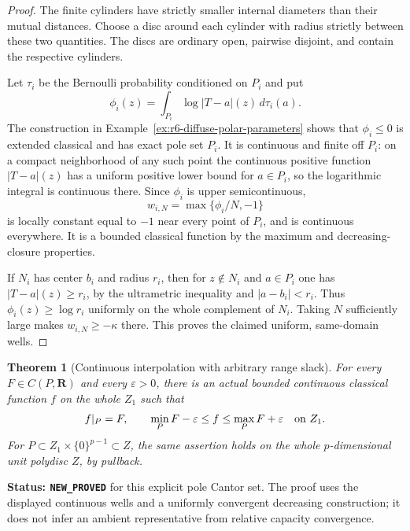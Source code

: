 \documentclass[11pt,a4paper]{article}
\numberwithin{equation}{section}
\newtheorem{theorem}{Theorem}[section]
\theoremstyle{definition}
\theoremstyle{remark}
\begin{document}
\begin{proof}
The finite cylinders have strictly smaller internal diameters than
their mutual distances. Choose a disc around each cylinder with radius
strictly between these two quantities. The discs are ordinary open,
pairwise disjoint, and contain the respective cylinders.

Let $\tau_i$ be the Bernoulli probability conditioned on $P_i$ and put
\[
              \phi_i(z)=\int_{P_i}\log|T-a|(z)\,d\tau_i(a).
\]
The construction in Example~\ref{ex:r6-diffuse-polar-parameters}
shows that $\phi_i\le0$ is extended classical and has exact pole set
$P_i$. It is continuous and finite off $P_i$: on a compact neighborhood
of any such point the continuous positive function $|T-a|(z)$ has a
uniform positive lower bound for $a\in P_i$, so the logarithmic
integral is continuous there. Since $\phi_i$ is upper semicontinuous,
\[
                         w_{i,N}=\max\{\phi_i/N,-1\}
\]
is locally constant equal to $-1$ near every point of $P_i$, and is
continuous everywhere. It is a bounded classical function by the
maximum and decreasing-closure properties.

If $N_i$ has center $b_i$ and radius $r_i$, then for $z\notin N_i$
and $a\in P_i$ one has $|T-a|(z)\ge r_i$, by the ultrametric
inequality and $|a-b_i|<r_i$. Thus
$\phi_i(z)\ge\log r_i$ uniformly on the whole complement of $N_i$.
Taking $N$ sufficiently large makes $w_{i,N}\ge-\kappa$ there.
This proves the claimed uniform, same-domain wells.
\end{proof}

\begin{theorem}[Continuous interpolation with arbitrary range slack]
\label{thm:r6-cantor-classical-interpolation}
For every $F\in C(P,\mathbf R)$ and every $\varepsilon>0$, there is
an actual bounded continuous classical function $f$ on the whole
$Z_1$ such that
\[
 f|_P=F,\qquad
 \min_P F-\varepsilon\le f\le\max_P F+\varepsilon
                              \quad\hbox{on }Z_1.
\]
For $P\subset Z_1\times\{0\}^{p-1}\subset Z$, the same assertion
holds on the whole $p$-dimensional unit polydisc $Z$, by pullback.
\end{theorem}

\noindent\textbf{Status: \texttt{NEW\_PROVED}} for this explicit
pole Cantor set. The proof uses the displayed continuous wells and a
uniformly convergent decreasing construction; it does not infer an
ambient representative from relative capacity convergence.
\end{document}
